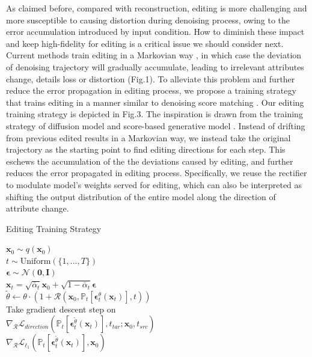 \documentclass[letterpaper]{article} %
\begin{document}
As claimed before, compared with reconstruction, editing is more challenging and more susceptible to causing distortion during denoising process, owing to the error accumulation introduced by input condition. How to diminish these impact and keep high-fidelity for editing is a critical issue we should consider next. Current methods train editing in a Markovian way \cite{kim2022diffusionclip, kwon2022diffusion}, in which case the deviation of denoising trajectory will gradually accumulate,
leading to %
irrelevant attributes change,
details loss or distortion (Fig.1). To alleviate this problem and further reduce the error propagation in editing process, we propose a training strategy that trains editing in a manner similar to denoising score matching \cite{song2020score}. Our editing training strategy is depicted in Fig.3. The inspiration is drawn from the training strategy of
diffusion model \cite{ho2020denoising} and score-based generative model \cite{song2020score}.
Instead of drifting from previous edited results in a Markovian way,
we instead take %
the original trajectory as the starting point to find editing directions for each step.
This eschews the accumulation of the %
the deviations caused by editing,
and further reduces the error propagated in editing process. Specifically, we reuse the rectifier to modulate model's weights served for editing, which can also be interpreted as shifting the output distribution of the entire model along the direction of attribute change.

\begin{algorithm}[t]
    \caption{Editing Training Strategy}
    \label{alg:algorithm}
    \begin{algorithmic}[1]
        \REPEAT
            \STATE $\bm{x}_0 \sim q(\bm{x}_0)$\\
            \STATE $t \sim \mathrm{Uniform}(\{1,...,T\})$\\
            \STATE $\bm{\epsilon} \sim \mathcal{N}(\bm{0},\bm{I})$\\
            \STATE $\bm{x}_t = \sqrt{\bar{\alpha}_t}\bm{x}_0 + \sqrt{1-\bar{\alpha}_t}\bm{\epsilon}$\\
            \STATE $\tilde{\theta} \gets \theta \cdot (1+\bm{\mathcal{R}}(\bm{x}_{0}, \mathbb{P}_t[\bm{\epsilon}_t^\theta(\bm{x}_t)], t))$\\
            \STATE Take gradient descent step on\\
                \qquad $\nabla_{\mathcal{R}} \mathcal{L}_{direction}(\mathbb{P}_t[\bm{\epsilon}_t^{\tilde{\theta}}(\bm{x}_t)], t_{tar};\bm{x}_{0},t_{src})$\\
                \qquad $\nabla_{\mathcal{R}} \mathcal{L}_{\ell_1}(\mathbb{P}_t[\bm{\epsilon}_t^{\tilde{\theta}}(\bm{x}_t)], \bm{x}_0)$
    \end{algorithmic}
\end{algorithm}
\end{document}
